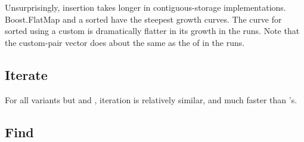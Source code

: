 
Unsurprisingly, insertion takes longer in contiguous-storage implementations.
Boost.FlatMap and a sorted  have the steepest
growth curves.  The curve for sorted  using a custom
 is dramatically flatter in its growth in the 
runs.  Note that the custom-pair vector does about the same as the
 of  in the  runs.

\subsection{Iterate}


For all variants but  and , iteration is
relatively similar, and much faster than 's.

\subsection{Find}

